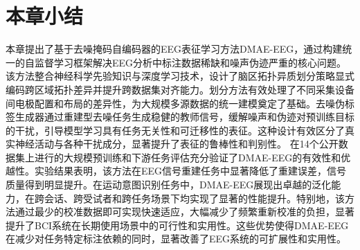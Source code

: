 \section{本章小结}
本章提出了基于去噪掩码自编码器的EEG表征学习方法DMAE-EEG，通过构建统一的自监督学习框架解决EEG分析中标注数据稀缺和噪声伪迹严重的核心问题。该方法整合神经科学先验知识与深度学习技术，设计了脑区拓扑异质划分策略显式编码跨区域拓扑差异并提升跨数据集对齐能力。划分方法有效处理了不同采集设备间电极配置和布局的差异性，为大规模多源数据的统一建模奠定了基础。去噪伪标签生成器通过重建型去噪任务生成稳健的教师信号，缓解噪声和伪迹对预训练目标的干扰，引导模型学习具有任务无关性和可迁移性的表征。这种设计有效区分了真实神经活动与各种干扰成分，显著提升了表征的鲁棒性和判别性。
在14个公开数据集上进行的大规模预训练和下游任务评估充分验证了DMAE-EEG的有效性和优越性。实验结果表明，该方法在EEG信号重建任务中显著降低了重建误差，信号质量得到明显提升。在运动意图识别任务中，DMAE-EEG展现出卓越的泛化能力，在跨会话、跨受试者和跨任务场景下均实现了显著的性能提升。特别地，该方法通过最少的校准数据即可实现快速适应，大幅减少了频繁重新校准的负担，显著提升了BCI系统在长期使用场景中的可行性和实用性。这些优势使得DMAE-EEG在减少对任务特定标注依赖的同时，显著改善了EEG系统的可扩展性和实用性。

